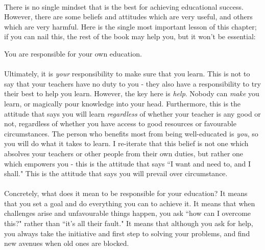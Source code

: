 	\paragraph{}
	There is no single mindset that is the best for achieving educational success. However, there
	are some beliefs and attitudes which are very useful, and others which are very harmful. 
	Here is the single most important lesson of this chapter; if you can nail this, the rest of the 
	book may help you, but it won't be essential: 
	
	\begin{crit}You are responsible for your own education.\end{crit}
	
	\paragraph{}
	Ultimately, it is \emph{your} responsibility to make sure that you learn. This is not to say
	that your teachers have no duty to you - they also have a responsibility to try their best to
	help you learn. However, the key here is \emph{help}. Nobody can \emph{make} you learn, or 
	magically pour knowledge into your head. Furthermore, this is the attitude that says you
	will learn \emph{regardless} of whether your teacher is any good or not, regardless of whether 
	you have access to good resources or favourable circumstances. The person who benefits most from
	being well-educated is \emph{you}, so you will do what it takes to learn. I re-iterate that this
	belief is not one which absolves your teachers or other people from their own duties, but rather
	one which empowers you - this is the attitude that says ``I want and need to, and I shall." 
	This is the attitude that says you will prevail over circumstance. 
	
	\paragraph{}
	Concretely, what does it mean to be responsible for your education? It means that you set 
	a goal and do everything you can to achieve it. It means that when challenges arise and 
	unfavourable things happen, you ask ``how can I overcome this?" rather than ``it's all their
	fault." It means that although you ask for help, you always take the initiative and first step
	to solving your problems, and find new avenues when old ones are blocked. 
	

